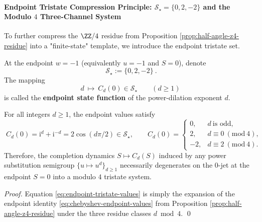 \paragraph{Endpoint Tristate Compression Principle: \texorpdfstring{$\mathcal S_{\star}=\{0,2,-2\}$}{S*={0,2,-2}} and the Modulo \texorpdfstring{$4$}{4} Three-Channel System}
To further compress the \(\ZZ/4\) residue from Proposition \ref{prop:half-angle-z4-residue} into a "finite-state" template, we introduce the endpoint tristate set.

\begin{definition}\label{def:endpoint-tristate-set}
At the endpoint \(w=-1\) (equivalently \(u=-1\) and \(S=0\)), denote
\[
\boxed{\ \mathcal S_{\star}:=\{0,2,-2\}\ }.
\]
The mapping
\[
d\ \longmapsto\ C_d(0)\in\mathcal S_{\star}\qquad(d\ge 1)
\]
is called the \textbf{endpoint state function} of the power-dilation exponent \(d\).
\end{definition}

\begin{corollary}\label{cor:endpoint-tristate-compression}
For all integers \(d\ge 1\), the endpoint values satisfy
\begin{equation}\label{eq:endpoint-tristate-values}
\boxed{\;
C_d(0)=\mathrm{i}^{d}+\mathrm{i}^{-d}=2\cos(d\pi/2)\in\mathcal S_{\star},\qquad
C_d(0)=
\begin{cases}
0, & d\ \text{is odd},\\
2, & d\equiv 0\ (\mathrm{mod}\ 4),\\
-2,& d\equiv 2\ (\mathrm{mod}\ 4).
\end{cases}\;}
\end{equation}
Therefore, the completion dynamics \(S\mapsto C_d(S)\) induced by any power substitution semigroup \(\{u\mapsto u^d\}_{d\ge 1}\) necessarily degenerates on the \(0\)-jet at the endpoint \(S=0\) into a modulo \(4\) tristate system.
\end{corollary}
\begin{proof}
Equation \eqref{eq:endpoint-tristate-values} is simply the expansion of the endpoint identity \eqref{eq:chebyshev-endpoint-values} from Proposition \ref{prop:half-angle-z4-residue} under the three residue classes \(d\bmod 4\). \qed
\end{proof}

